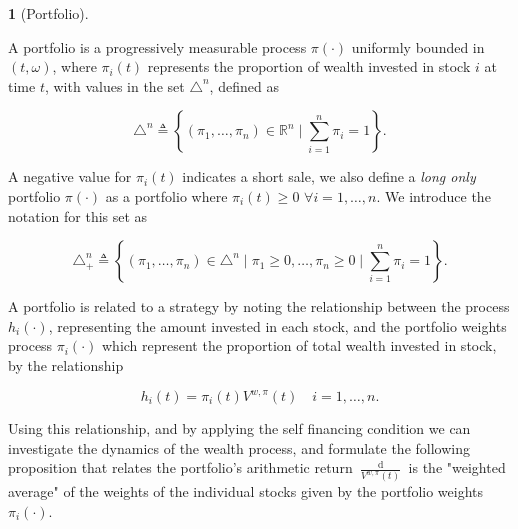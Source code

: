 \documentclass[british]{amsart} \usepackage{lmodern}
\numberwithin{equation}{section} \numberwithin{figure}{section}
\theoremstyle{plain} \newtheorem{thm}{\protect\theoremname}[section]
\theoremstyle{definition} \newtheorem{defn}[thm]{\protect\definitionname}
\theoremstyle{plain} \newtheorem{assumption}[thm]{\protect\assumptionname}
\theoremstyle{plain} \newtheorem{lem}[thm]{\protect\lemmaname}
\theoremstyle{plain} \newtheorem{prop}[thm]{\protect\propositionname}
\theoremstyle{remark} \newtheorem{rem}[thm]{\protect\remarkname}
\theoremstyle{plain} \newtheorem{cor}[thm]{\protect\corollaryname}
\renewcommand{\d}[1]{\mathop{\mathrm{d}{#1}}}
\newcommand{\defeq}{\mathop{\triangleq}} \newcommand{\almostsurely}{\text{a.s.}}
\newcommand{\rangei}{i=1,\dots,n} \newcommand{\measure}{\mathbb{P}}
\newcommand{\V}{V^{w,\pi}}
\begin{document}
\begin{defn} [Portfolio]
  \label{def:portfolio}

  A portfolio is a progressively measurable process $\pi(\cdot)$ uniformly
  bounded in $(t,\omega)$, where $\pi_{i}(t)$ represents the proportion of wealth
  invested in stock $i$ at time $t$, with values in the set $\triangle^{n}$,
  defined as 

  \begin{equation*}
    \triangle^{n} \defeq 
    \left\{
          (\pi_{1}, \dots, \pi_{n}) \in \mathbb{R}^{n} 
          \mid
          \sum_{i=1}^{n} \pi_{i} = 1
    \right\}.
  \end{equation*}

  A negative value for $\pi_{i}(t)$ indicates a short sale, we also define a
  \textit{long only} portfolio $\pi(\cdot)$ as a portfolio where $\pi_{i}(t) \ge
  0$ $\forall \rangei$. We introduce the notation for this set as

  \begin{equation*}
    \triangle_{+}^{n} \defeq 
    \left\{
          (\pi_{1}, \dots, \pi_{n}) \in \triangle^{n} 
          \mid
          \pi_{1} \ge 0, \dots, \pi_{n} \ge 0
          \mid
          \sum_{i=1}^{n} \pi_{i} = 1
    \right\}.
  \end{equation*}

\end{defn}

A portfolio is related to a strategy by noting the relationship between the
process $h_{i}(\cdot)$, representing the amount invested in each stock, and the
portfolio weights process $\pi_{i}(\cdot)$ which represent the proportion of
total wealth invested in stock, by the relationship

\begin{equation}
  \label{eq:wealthinvestedbyportfolio}
  h_i(t) = \pi_{i}(t)\V(t)
  \quad \rangei.
\end{equation}

Using this relationship, and by applying the self financing condition we can
investigate the dynamics of the wealth process, and formulate the following
proposition that relates the portfolio's arithmetic return
$\frac{\d{\V(t)}}{\V(t)}$ is the "weighted average" of the weights of the
individual stocks given by the portfolio weights $\pi_{i}(\cdot)$.
\end{document}
